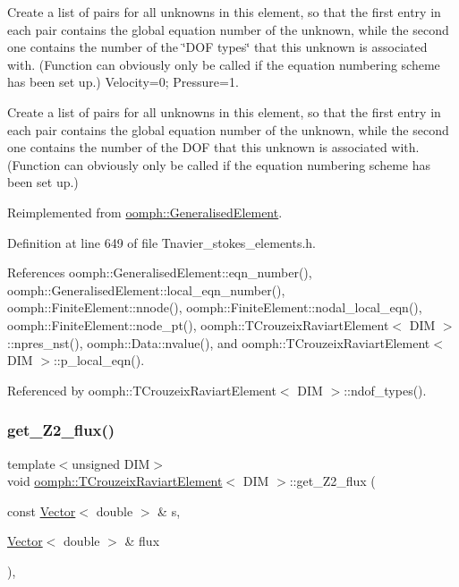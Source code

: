 Create a list of pairs for all unknowns in this element, so that the first entry in each pair contains the global equation number of the unknown, while the second one contains the number of the \char`\"{}\+D\+O\+F types\char`\"{} that this unknown is associated with. (Function can obviously only be called if the equation numbering scheme has been set up.) Velocity=0; Pressure=1. 

Create a list of pairs for all unknowns in this element, so that the first entry in each pair contains the global equation number of the unknown, while the second one contains the number of the D\+OF that this unknown is associated with. (Function can obviously only be called if the equation numbering scheme has been set up.) 

Reimplemented from \hyperlink{classoomph_1_1GeneralisedElement_a069f59bfc3e607a5bebba52c6314d777}{oomph\+::\+Generalised\+Element}.



Definition at line 649 of file Tnavier\+\_\+stokes\+\_\+elements.\+h.



References oomph\+::\+Generalised\+Element\+::eqn\+\_\+number(), oomph\+::\+Generalised\+Element\+::local\+\_\+eqn\+\_\+number(), oomph\+::\+Finite\+Element\+::nnode(), oomph\+::\+Finite\+Element\+::nodal\+\_\+local\+\_\+eqn(), oomph\+::\+Finite\+Element\+::node\+\_\+pt(), oomph\+::\+T\+Crouzeix\+Raviart\+Element$<$ D\+I\+M $>$\+::npres\+\_\+nst(), oomph\+::\+Data\+::nvalue(), and oomph\+::\+T\+Crouzeix\+Raviart\+Element$<$ D\+I\+M $>$\+::p\+\_\+local\+\_\+eqn().



Referenced by oomph\+::\+T\+Crouzeix\+Raviart\+Element$<$ D\+I\+M $>$\+::ndof\+\_\+types().

\mbox{\label{classoomph_1_1TCrouzeixRaviartElement_a7710fd1d14ecd50ee389cac1c57871b6}} 
\subsubsection{\texorpdfstring{get\+\_\+\+Z2\+\_\+flux()}{get\_Z2\_flux()}}
{\footnotesize\ttfamily template$<$unsigned D\+IM$>$ \\
void \hyperlink{classoomph_1_1TCrouzeixRaviartElement}{oomph\+::\+T\+Crouzeix\+Raviart\+Element}$<$ D\+IM $>$\+::get\+\_\+\+Z2\+\_\+flux (\begin{DoxyParamCaption}\item[{const \hyperlink{classoomph_1_1Vector}{Vector}$<$ double $>$ \&}]{s,  }\item[{\hyperlink{classoomph_1_1Vector}{Vector}$<$ double $>$ \&}]{flux }\end{DoxyParamCaption})\hspace{0.3cm}{\ttfamily [inline]}, {\ttfamily [virtual]}}



